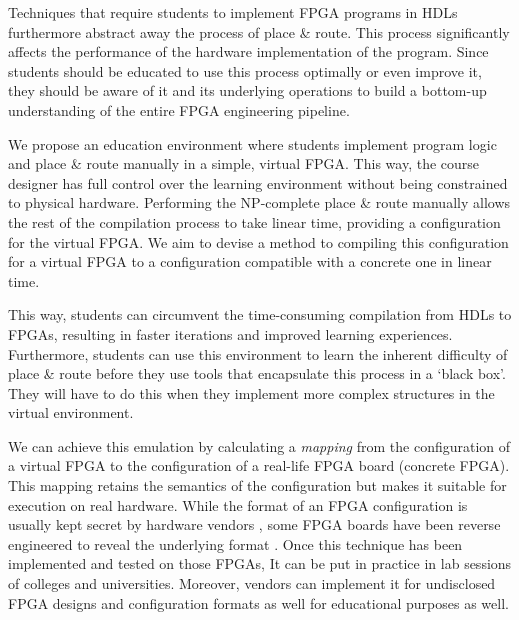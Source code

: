 Techniques that require students to implement FPGA programs in HDLs furthermore abstract away the process of place \& route. This process significantly affects the performance of the hardware implementation of the program. Since students should be educated to use this process optimally or even improve it, they should be aware of it and its underlying operations to build a bottom-up understanding of the entire FPGA engineering pipeline.

We propose an education environment where students implement program logic and place \& route manually in a simple, virtual FPGA. This way, the course designer has full control over the learning environment without being constrained to physical hardware. Performing the NP-complete place \& route manually allows the rest of the compilation process to take linear time, providing a configuration for the virtual FPGA. We aim to devise a method to compiling this configuration for a virtual FPGA to a configuration compatible with a concrete one in linear time.

This way, students can circumvent the time-consuming compilation from HDLs to FPGAs, resulting in faster iterations and improved learning experiences. Furthermore, students can use this environment to learn the inherent difficulty of place \& route before they use tools that encapsulate this process in a `black box'. They will have to do this when they implement more complex structures in the virtual environment.

We can achieve this emulation by calculating a \textit{mapping} from the configuration of a virtual FPGA to the configuration of a real-life FPGA board (concrete FPGA). This mapping retains the semantics of the configuration but makes it suitable for execution on real hardware. While the format of an FPGA configuration is usually kept secret by hardware vendors \cite{Hauck:2007:RCT:1564780, 8653869, 6339165}, some FPGA boards have been reverse engineered to reveal the underlying format \cite{Yu2018, trellis}. Once this technique has been implemented and tested on those FPGAs, It can be put in practice in lab sessions of colleges and universities. Moreover, vendors can implement it for undisclosed FPGA designs and configuration formats as well for educational purposes as well.


